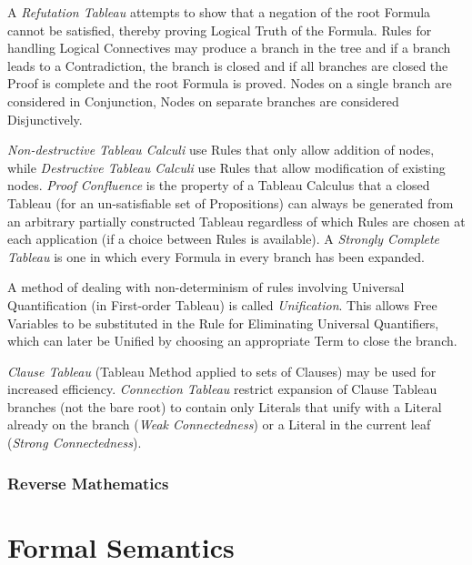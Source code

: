 \documentclass{article}
\begin{document}
A \emph{Refutation Tableau} attempts to show that a negation of the
root Formula cannot be satisfied, thereby proving Logical Truth of the
Formula. Rules for handling Logical Connectives may produce a branch
in the tree and if a branch leads to a Contradiction, the branch is
closed and if all branches are closed the Proof is complete and the
root Formula is proved. Nodes on a single branch are considered in
Conjunction, Nodes on separate branches are considered Disjunctively.

\emph{Non-destructive Tableau Calculi} use Rules that only allow
addition of nodes, while \emph{Destructive Tableau Calculi} use Rules
that allow modification of existing nodes. \emph{Proof Confluence} is
the property of a Tableau Calculus that a closed Tableau (for an
un-satisfiable set of Propositions) can always be generated from an
arbitrary partially constructed Tableau regardless of which Rules are
chosen at each application (if a choice between Rules is available). A
\emph{Strongly Complete Tableau} is one in which every Formula in
every branch has been expanded.

A method of dealing with non-determinism of rules involving Universal
Quantification (in First-order Tableau) is called
\emph{Unification}. This allows Free Variables to be substituted in
the Rule for Eliminating Universal Quantifiers, which can later be
Unified by choosing an appropriate Term to close the branch.

\emph{Clause Tableau} (Tableau Method applied to sets of Clauses) may
be used for increased efficiency. \emph{Connection Tableau} restrict
expansion of Clause Tableau branches (not the bare root) to contain
only Literals that unify with a Literal already on the branch
(\emph{Weak Connectedness}) or a Literal in the current leaf
(\emph{Strong Connectedness}).



\section{Reverse Mathematics} \label{sec:reverse_mathematics}



\part{Formal Semantics}
\end{document}
